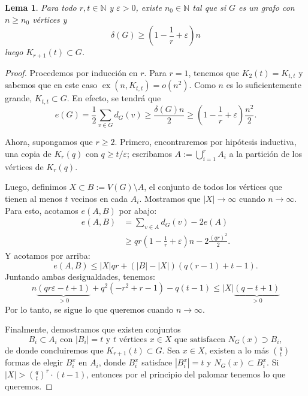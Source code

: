 \documentclass[12pt]{report}
\theoremstyle{plain}
\newtheorem{lemma}[theorem]{Lema}
\theoremstyle{definition}
\newcommand{\naturals}{\mathbb{N}}
\newcommand{\abs}[1]{\left \vert #1 \right \vert}
\newcommand{\ex}[2]{\operatorname{ex} (#1, #2)}
\begin{document}
\begin{lemma}\label{lema:erdos-stone lema 2}
Para todo $r, t \in \naturals$ y $\varepsilon > 0$, existe $n_0 \in \naturals$ tal que si $G$ es un grafo con $n \geq n_0$ vértices y
\[
    \delta (G) \geq \left ( 1 - \frac 1 r + \varepsilon \right ) n
\]
luego $K_{r+1} (t) \subset G$.
\end{lemma}
\begin{proof}
Procedemos por inducción en $r$. Para $r = 1$, tenemos que $K_2 (t) = K_{t,t}$ y sabemos que en este caso $\ex n {K_{t,t}} = o (n^2)$. Como $n$ es lo suficientemente grande, $K_{t,t} \subset G$. En efecto, se tendrá que
\[
    e(G) = \frac 1 2 \sum_{v \in G} d_G (v ) \geq \frac{\delta (G) n}{2} \geq \left (1 - \frac 1 r + \varepsilon \right ) \frac{n^2}{2}.
\]


Ahora, supongamos que $r \geq 2$. Primero, encontraremos por hipótesis inductiva, una copia de $K_{r} (q)$ con $q \geq t/\varepsilon$; escribamos $A := \bigcup_{i = 1}^r A_i$ a la partición de los vértices de $K_r (q)$.

Luego, definimos $X \subset B := V(G) \setminus A$, el conjunto de todos los vértices que tienen al menos $t$ vecinos en cada $A_i$. Mostramos que $\abs X \to \infty$ cuando $n \to \infty$. Para esto, acotamos $e(A,B)$ por abajo:
\begin{align*}
    e(A,B) &= \sum_{v \in A}  d_G (v) - 2 e(A) \\
        &\geq q r  \left (1 - \frac 1 r + \varepsilon \right )n - 2 \frac{(q r)^2}{2}.
\end{align*}
Y acotamos por arriba:
\[
    e(A,B) \leq \abs X  q r + ( \abs B - \abs X) ( q (r-1) + t - 1).
\]
Juntando ambas desigualdades, tenemos:
\[
    n\underbrace{(q r \varepsilon - t  + 1)}_{>0} + q^2 (- r^2 +r - 1) - q (t- 1) \leq \abs X \underbrace{( q - t +1)}_{> 0}
\]
Por lo tanto, se sigue lo que queremos cuando $n \to \infty$.

Finalmente, demostramos que existen conjuntos
\[
    B_i \subset A_i \text{ con } \abs {B_i} = t \text{ y $t$ vértices $x \in X$ que satisfacen } N_G (x) \supset B_i,
\]
de donde concluiremos que $K_{r+1} (t) \subset G$.
Sea $x \in X$, existen a lo más $\binom q t$ formas de elegir $B_i^x$ en $A_i$, donde $B_i^x$ satisface $\abs{B_i^x} = t$ y $N_G (x) \subset B_i^x$. Si $\abs X > \binom q t ^r \cdot (t-1)$, entonces por el principio del palomar tenemos lo que queremos.
\end{proof}
\end{document}
